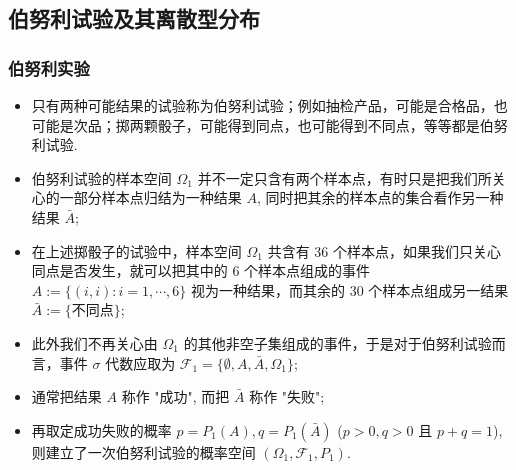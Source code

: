 \documentclass[Prob-All.tex]{subfiles}
\begin{document}
\subsection{伯努利试验及其离散型分布}
\begin{frame}
	\frametitle{伯努利实验}
	\begin{itemize}[<+-|alert@+>]
		\item 只有两种可能结果的试验称为伯努利试验；例如抽检产品，可能是合格品，也可能是次品；掷两颗骰子，可能得到同点，也可能得到不同点，等等都是伯努利试验.
		\item 伯努利试验的样本空间 $\Omega_1$ 并不一定只含有两个样本点，有时只是把我们所关心的一部分样本点归结为一种结果 $A$, 同时把其余的样本点的集合看作另一种结果 $\bar{A}$;
		\item 在上述掷骰子的试验中，样本空间 $\Omega_1$ 共含有 36 个样本点，如果我们只关心同点是否发生，就可以把其中的 6 个样本点组成的事件 $A:=\{(i,i):i=1,\cdots, 6\}$ 视为一种结果，而其余的 30 个样本点组成另一结果 $\bar{A}:=\{\mbox{不同点}\}$;
		\item 此外我们不再关心由 $\Omega_1$ 的其他非空子集组成的事件，于是对于伯努利试验而言，事件 $\sigma$ 代数应取为 $\mathcal{F}_1=\{\emptyset, A, \bar{A}, \Omega_1\}$;
		\item 通常把结果 $A$ 称作 "成功", 而把 $\bar{A}$ 称作 "失败";
		\item 再取定成功失败的概率 $p=P_1(A), q=P_1(\bar{A})$ ($p>0,q>0$ 且 $p+q=1$), 则建立了一次伯努利试验的概率空间 $(\Omega_1,\mathcal{F}_1,P_1)$.
	\end{itemize}
\end{frame}
\end{document}
